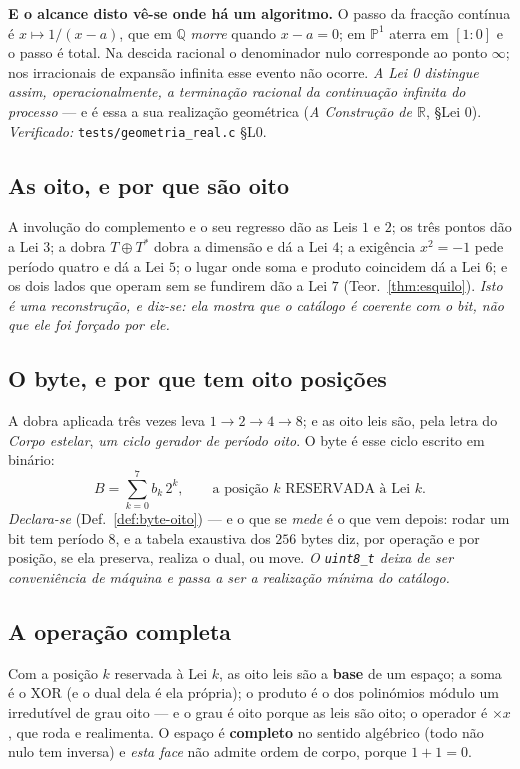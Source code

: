 \documentclass[11pt,a4paper]{article}
\newcommand{\code}[1]{\texttt{\small #1}}
\begin{document}
\textbf{E o alcance disto vê-se onde há um algoritmo.} O passo da fracção
contínua é $x\mapsto1/(x-a)$, que em $\mathbb{Q}$ \emph{morre} quando $x-a=0$; em
$\mathbb{P}^1$ aterra em $[1:0]$ e o passo é total. Na descida racional o
denominador nulo corresponde ao ponto $\infty$; nos irracionais de expansão
infinita esse evento não ocorre. \emph{A Lei 0 distingue assim,
operacionalmente, a terminação racional da continuação infinita do processo}
--- e é essa a sua realização geométrica (\emph{A Construção de $\mathbb{R}$},
\S Lei 0). \emph{Verificado:} \code{tests/geometria\_real.c} \S L0.

\subsection*{As oito, e por que são oito}
A involução do complemento e o seu regresso dão as Leis $1$ e $2$; os
três pontos dão a Lei $3$; a dobra $T\oplus T^{*}$ dobra a dimensão e
dá a Lei $4$; a exigência $x^{2}=-1$ pede período quatro e dá a Lei
$5$; o lugar onde soma e produto coincidem dá a Lei $6$; e os dois
lados que operam sem se fundirem dão a Lei $7$
(Teor.~\ref{thm:esquilo}). \emph{Isto é uma reconstrução, e diz-se: ela
mostra que o catálogo é coerente com o bit, não que ele foi forçado por
ele.}

\subsection*{O byte, e por que tem oito posições}
A dobra aplicada três vezes leva $1\to2\to4\to8$; e as oito leis são,
pela letra do \emph{Corpo estelar}, \emph{um ciclo gerador de período
oito}. O byte é esse ciclo escrito em binário:
\[
\boxed{\;B=\sum_{k=0}^{7}b_k\,2^{k},
\qquad \text{a posição }k\text{ RESERVADA à Lei }k.\;}
\]
\emph{Declara-se} (Def.~\ref{def:byte-oito}) --- e o que se \emph{mede} é
o que vem depois: rodar um bit tem período $8$, e a tabela exaustiva dos
$256$ bytes diz, por operação e por posição, se ela preserva, realiza o
dual, ou move. \emph{O \code{uint8\_t} deixa de ser conveniência de
máquina e passa a ser a realização mínima do catálogo.}

\subsection*{A operação completa}
Com a posição $k$ reservada à Lei $k$, as oito leis são a \textbf{base} de
um espaço; a soma é o XOR (e o dual dela é ela própria); o produto é o
dos polinómios módulo um irredutível de grau oito --- e o grau é oito
porque as leis são oito; o operador é $\times x$, que roda e realimenta.
O espaço é \textbf{completo} no sentido algébrico (todo não nulo tem
inversa) e \emph{esta face} não admite ordem de corpo, porque $1+1=0$.
\end{document}
